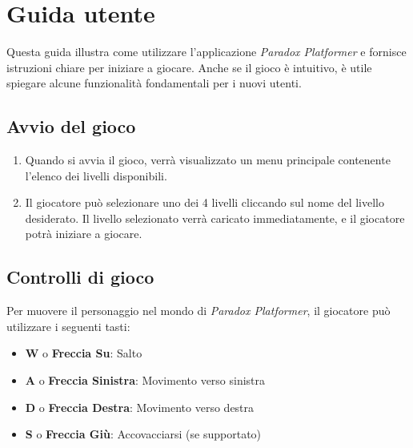 \documentclass[a4paper,12pt]{report}
\begin{document}
\appendix
\chapter{Guida utente}

Questa guida illustra come utilizzare l’applicazione \textit{Paradox Platformer} e fornisce istruzioni chiare per iniziare a giocare. Anche se il gioco è intuitivo, è utile spiegare alcune funzionalità fondamentali per i nuovi utenti.

\section{Avvio del gioco}

\begin{enumerate}
    \item Quando si avvia il gioco, verrà visualizzato un menu principale contenente l’elenco dei livelli disponibili.
    \item Il giocatore può selezionare uno dei 4 livelli cliccando sul nome del livello desiderato. Il livello selezionato verrà caricato immediatamente, e il giocatore potrà iniziare a giocare.
\end{enumerate}

\section{Controlli di gioco}

Per muovere il personaggio nel mondo di \textit{Paradox Platformer}, il giocatore può utilizzare i seguenti tasti:

\begin{itemize}
    \item \textbf{W} o \textbf{Freccia Su}: Salto
    \item \textbf{A} o \textbf{Freccia Sinistra}: Movimento verso sinistra
    \item \textbf{D} o \textbf{Freccia Destra}: Movimento verso destra
    \item \textbf{S} o \textbf{Freccia Giù}: Accovacciarsi (se supportato)
\end{itemize}



\end{document}
